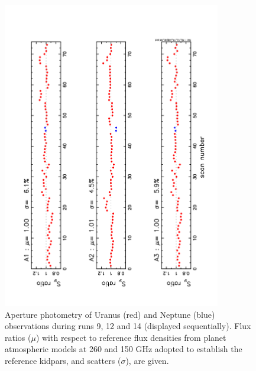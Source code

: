 









\begin{figure}[ht!]
  \begin{center}
    \includegraphics[clip=true,angle=-90.,width=0.85\textwidth]{Figures/Aperture_photo/Flux_ratio_index_A1_A2_A3_r9_r12_r14.pdf}
    \caption{Aperture photometry of Uranus (red) and Neptune (blue) observations during runs 9, 12 and 14 (displayed sequentially). Flux ratios ($\mu$) with respect to
reference flux densities from planet atmospheric models at 260 and 150 GHz adopted to establish the  reference kidpars,  and scatters ($\sigma$), are given.}
    \label{fig:Uranus_s308}
  \end{center}
\end{figure}



